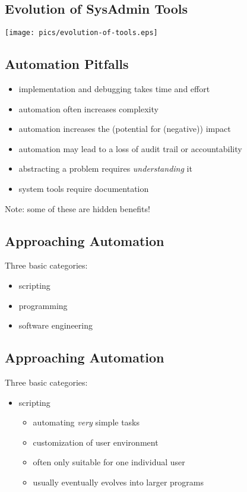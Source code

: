 \documentclass[xga]{xdvislides}
\begin{document}
\subsection{Evolution of SysAdmin Tools}
\vspace*{\fill}
\begin{center}
	\texttt{[image: pics/evolution-of-tools.eps]}
\end{center}
\vspace*{\fill}

\subsection{Automation Pitfalls}
\begin{itemize}
	\item implementation and debugging takes time and effort
	\item automation often increases complexity
	\item automation increases the (potential for (negative)) impact
	\item automation may lead to a loss of audit trail or accountability
	\item abstracting a problem requires {\em understanding} it
	\item system tools require documentation
\end{itemize}
\vspace{.5in}
Note: some of these are hidden benefits!


\subsection{Approaching Automation}
Three basic categories:
\\

\begin{itemize}
	\item scripting
	\item programming
	\item software engineering
\end{itemize}

\subsection{Approaching Automation}
Three basic categories:
\\

\begin{itemize}
	\item scripting
		\begin{itemize}
			\item automating {\em very} simple tasks
			\item customization of user environment
			\item often only suitable for one individual user
			\item usually eventually evolves into larger programs
		\end{itemize}
\end{itemize}
\end{document}
